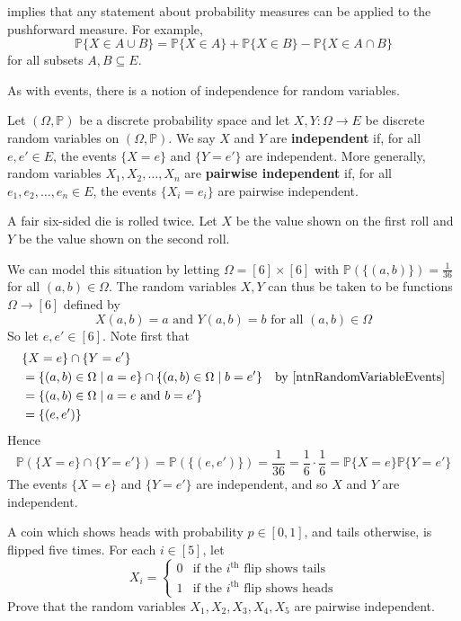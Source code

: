  implies that any statement about probability measures can be applied to the pushforward measure. For example,
\[ \mathbb{P}\{X \in A \cup B\} = \mathbb{P}\{X \in A\} + \mathbb{P}\{X \in B\} - \mathbb{P}\{X \in A \cap B\} \]
for all subsets $A,B \subseteq E$.

As with events, there is a notion of independence for random variables.

\begin{definition}
\label{defIndependentRandomVariables}
Let $(\Omega,\mathbb{P})$ be a discrete probability space and let $X,Y : \Omega \to E$ be discrete random variables on $(\Omega,\mathbb{P})$. We say $X$ and $Y$ are \textbf{independent} if, for all $e,e' \in E$, the events $\{ X=e \}$ and $\{ Y=e' \}$ are independent. More generally, random variables $X_1,X_2,\dots,X_n$ are \textbf{pairwise independent} if, for all $e_1,e_2,\dots,e_n \in E$, the events $\{ X_i = e_i \}$ are pairwise independent.
\end{definition}

\begin{example}
A fair six-sided die is rolled twice. Let $X$ be the value shown on the first roll and $Y$ be the value shown on the second roll.

We can model this situation by letting $\Omega = [6] \times [6]$ with $\mathbb{P}(\{(a,b)\})=\frac{1}{36}$ for all $(a,b) \in \Omega$. The random variables $X,Y$ can thus be taken to be functions $\Omega \to [6]$ defined by
\[ X(a,b)=a \text{ and } Y(a,b)=b \text{ for all } (a,b) \in \Omega \]
So let $e,e' \in [6]$. Note first that
\begin{align*}
& \{ X = e \} \cap \{ Y = e' \} && \\
&= \{ (a,b) \in \Omega \mid a=e \} \cap \{ (a,b) \in \Omega \mid b=e' \} && \text{by \Cref{ntnRandomVariableEvents}} \\
&= \{ (a,b) \in \Omega \mid a=e \text{ and } b=e' \} && \\
&= \{ (e,e') \} &&
\end{align*}
Hence
\[ \mathbb{P}(\{ X = e \} \cap \{ Y = e' \}) = \mathbb{P}(\{(e,e')\}) = \frac{1}{36} = \frac{1}{6} \cdot \frac{1}{6} = \mathbb{P}\{X=e\}\mathbb{P}\{Y=e'\} \]
The events $\{ X = e \}$ and $\{ Y = e' \}$ are independent, and so $X$ and $Y$ are independent.
\end{example}

\begin{exercise}
A coin which shows heads with probability $p \in [0,1]$, and tails otherwise, is flipped five times. For each $i \in [5]$, let
\[ X_i = \begin{cases} 0 & \text{if the } i^{\text{th}} \text{ flip shows tails} \\
1 & \text{if the } i^{\text{th}} \text{ flip shows heads} \end{cases} \]
Prove that the random variables $X_1,X_2,X_3,X_4,X_5$ are pairwise independent.
\end{exercise}

